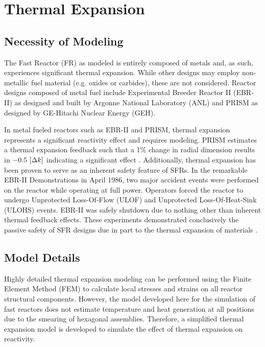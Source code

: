 \chapter{Thermal Expansion}
\label{ch:thermalExpansion}

\section{Necessity of Modeling}
  The Fast Reactor (FR) as modeled is entirely composed of
  metals and, as such, experiences significant thermal expansion. While other 
  designs may employ non-metallic fuel material (e.g. oxides or carbides), these 
  are not considered. Reactor designs composed of metal fuel include 
  Experimental Breeder Reactor II (EBR-II) as designed and built by Argonne 
  National Laboratory (ANL) and PRISM as designed by GE-Hitachi Nuclear Energy 
  (GEH).

  In metal fueled reactors such as EBR-II and PRISM, thermal expansion 
  represents a significant reactivity effect and requires modeling. PRISM 
  estimates a thermal expansion feedback such that a 1\% change in radial 
  dimension results in $-0.5 \,\left[\text{{$\Delta k$}}\right]$ indicating a significant effect 
  \cite{GEFR793}. Additionally, thermal expansion has been proven to serve as an 
  inherent safety feature of SFRs. In the remarkable EBR-II Demonstrations in 
  April 1986, two major accident events were performed on the reactor while 
  operating at full power. Operators forced the reactor to undergo Unprotected 
  Loss-Of-Flow (ULOF) and Unprotected Loss-Of-Heat-Sink (ULOHS) events. EBR-II 
  was safely shutdown due to nothing other than inherent thermal feedback 
  effects. These experiments demonstrated conclusively the passive safety of SFR
  designs due in part to the thermal expansion of materials 
  \cite{PlentifulEnergy}.

\section{Model Details}
  \label{sec:model_details}
  Highly detailed thermal expansion modeling can be performed using the Finite
  Element Method (FEM) to calculate local stresses and strains on all reactor
  structural components. However, the model developed here for the simulation of
  fast reactors does not estimate temperature and heat generation at all 
  positions due to the smearing of hexagonal assemblies. Therefore, a simplified 
  thermal expansion model is developed to simulate the effect of thermal 
  expansion on reactivity.

